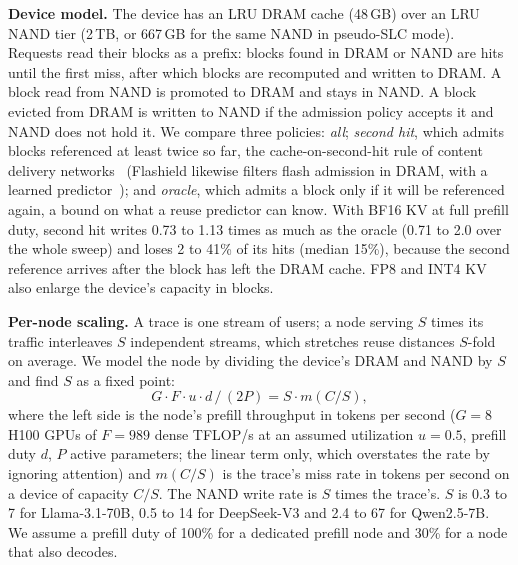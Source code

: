 \documentclass[acmsmall,screen,review]{acmart}
\begin{document}
\textbf{Device model.} The device has an LRU DRAM cache (48\,GB) over an LRU NAND tier (2\,TB,
or 667\,GB for the same NAND in pseudo-SLC mode). Requests read their blocks as a prefix: blocks
found in DRAM or NAND are hits until the first miss, after which blocks are recomputed and written
to DRAM. A block read from NAND is promoted to DRAM and stays in NAND. A block evicted from DRAM
is written to NAND if the admission policy accepts it and NAND does not hold it. We compare three
policies: \emph{all}; \emph{second hit}, which admits blocks referenced at least twice so far,
the cache-on-second-hit rule of content delivery networks~\cite{secondhit} (Flashield likewise
filters flash admission in DRAM, with a learned predictor~\cite{flashield}); and \emph{oracle},
which admits a block only if it will be referenced again, a bound on what a reuse predictor can
know. With BF16 KV at full prefill duty, second hit writes 0.73 to 1.13 times as much as the oracle
(0.71 to 2.0 over the whole sweep) and loses 2 to 41\% of its hits (median 15\%), because the
second reference arrives after the block has left the DRAM cache. FP8 and INT4 KV also
enlarge the device's capacity in blocks.

\textbf{Per-node scaling.} A trace is one stream of users; a node serving $S$ times its traffic
interleaves $S$ independent streams, which stretches reuse distances $S$-fold on average. We model the
node by dividing the device's DRAM and NAND by $S$ and find $S$ as a fixed point:
\begin{equation}
G \cdot F \cdot u \cdot d \,/\, (2P) = S \cdot m(C/S),
\end{equation}
where the left side is the node's prefill throughput in tokens per second ($G=8$ H100 GPUs of
$F=989$ dense TFLOP/s at an assumed utilization $u=0.5$, prefill duty $d$, $P$ active parameters;
the linear term only, which overstates the rate by ignoring attention) and $m(C/S)$
is the trace's miss rate in tokens per second on a device of capacity $C/S$. The NAND write rate
is $S$ times the trace's. $S$ is 0.3 to 7 for Llama-3.1-70B, 0.5 to 14 for DeepSeek-V3 and 2.4
to 67 for Qwen2.5-7B. We assume a prefill duty of 100\% for a dedicated prefill node and 30\% for a
node that also decodes.
\end{document}
